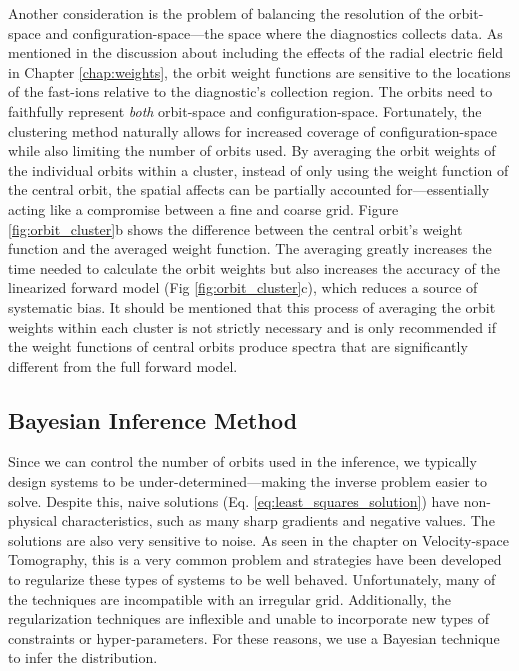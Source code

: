 Another consideration is the problem of balancing the resolution of the orbit-space and configuration-space---the space where the diagnostics collects data.
As mentioned in the discussion about including the effects of the radial electric field in Chapter \ref{chap:weights}, the orbit weight functions are sensitive to the locations of the fast-ions relative to the diagnostic's collection region.
The orbits need to faithfully represent \textit{both} orbit-space and configuration-space.
Fortunately, the clustering method naturally allows for increased coverage of configuration-space while also limiting the number of orbits used.
By averaging the orbit weights of the individual orbits within a cluster, instead of only using the weight function of the central orbit, the spatial affects can be partially accounted for---essentially acting like a compromise between a fine and coarse grid. Figure \ref{fig:orbit_cluster}b shows the difference between the central orbit's weight function and the averaged weight function.
The averaging greatly increases the time needed to calculate the orbit weights but also increases the accuracy of the linearized forward model (Fig \ref{fig:orbit_cluster}c), which reduces a source of systematic bias.
It should be mentioned that this process of averaging the orbit weights within each cluster is not strictly necessary and is only recommended if the weight functions of central orbits produce spectra that are significantly different from the full forward model.

\subsection{Bayesian Inference Method}
Since we can control the number of orbits used in the inference, we typically design systems to be under-determined---making the inverse problem easier to solve.
Despite this, naive solutions (Eq. \ref{eq:least_squares_solution}) have non-physical characteristics, such as many sharp gradients and negative values. The solutions are also very sensitive to noise.
As seen in the chapter on Velocity-space Tomography, this is a very common problem and strategies have been developed to regularize these types of systems to be well behaved. Unfortunately, many of the techniques are incompatible with an irregular grid.
Additionally, the regularization techniques are inflexible and unable to incorporate new types of constraints or hyper-parameters. For these reasons, we use a Bayesian technique to infer the distribution.

